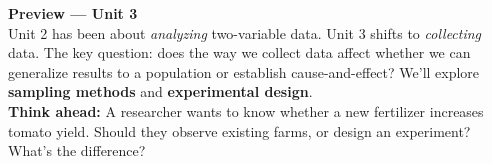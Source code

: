 \documentclass[10pt]{article}
\begin{document}
\vspace{0.16in}

\begin{tcolorbox}[colback=greenbg, colframe=greenacc, boxrule=0.8pt, arc=2mm,
    left=4mm, right=4mm, top=3mm, bottom=3mm]
\small\textbf{Preview --- Unit 3}\\[4pt]
Unit 2 has been about \emph{analyzing} two-variable data. Unit 3 shifts to \emph{collecting}
data. The key question: does the way we collect data affect whether we can generalize results
to a population or establish cause-and-effect? We'll explore \textbf{sampling methods} and
\textbf{experimental design}.\\[6pt]
\textbf{Think ahead:} A researcher wants to know whether a new fertilizer increases tomato
yield. Should they observe existing farms, or design an experiment? What's the difference?\\[6pt]
\end{tcolorbox}
\end{document}
